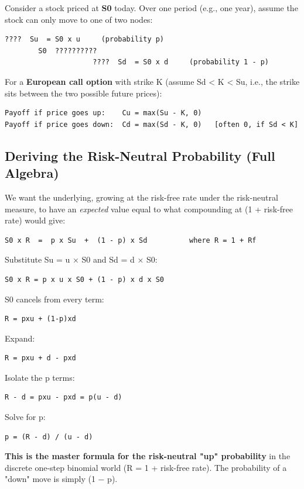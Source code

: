 \documentclass[12pt,openany]{book}
\theoremstyle{definition}
\theoremstyle{remark}
\begin{document}
Consider a stock priced at \textbf{S0} today. Over one period (e.g., one year), assume the stock can only move to one of two nodes:

\begin{lstlisting}[style=notesCode]
                     ????  Su  = S0 x u     (probability p)
        S0  ??????????
                     ????  Sd  = S0 x d     (probability 1 - p)
\end{lstlisting}

For a \textbf{European call option} with strike K (assume Sd < K < Su, i.e., the strike sits between the two possible future prices):
\begin{lstlisting}[style=notesCode]
Payoff if price goes up:    Cu = max(Su - K, 0)
Payoff if price goes down:  Cd = max(Sd - K, 0)   [often 0, if Sd < K]
\end{lstlisting}

\subsection{Deriving the Risk-Neutral Probability (Full Algebra)}

We want the underlying, growing at the risk-free rate under the risk-neutral measure, to have an \emph{expected} value equal to what compounding at (1 + risk-free rate) would give:

\begin{lstlisting}[style=notesCode]
S0 x R  =  p x Su  +  (1 - p) x Sd          where R = 1 + Rf
\end{lstlisting}
Substitute Su = u × S0 and Sd = d × S0:
\begin{lstlisting}[style=notesCode]
S0 x R = p x u x S0 + (1 - p) x d x S0
\end{lstlisting}
S0 cancels from every term:
\begin{lstlisting}[style=notesCode]
R = pxu + (1-p)xd
\end{lstlisting}
Expand:
\begin{lstlisting}[style=notesCode]
R = pxu + d - pxd
\end{lstlisting}
Isolate the p terms:
\begin{lstlisting}[style=notesCode]
R - d = pxu - pxd = p(u - d)
\end{lstlisting}
Solve for p:
\begin{lstlisting}[style=notesCode]
p = (R - d) / (u - d)
\end{lstlisting}

\textbf{This is the master formula for the risk-neutral "up" probability} in the discrete one-step binomial world (R = 1 + risk-free rate). The probability of a "down" move is simply (1 − p).
\end{document}
